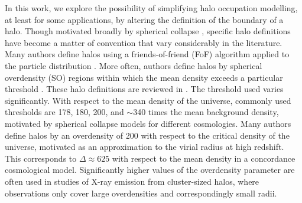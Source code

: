 \documentclass[usenatbib,fleqn]{mnras}
\begin{document}
In this work, we explore the possibility of simplifying halo occupation modelling, at least for some applications, by altering the definition of the boundary of a halo. Though motivated broadly by spherical collapse \citep{gunn_gott72, fillmore_goldreich84, ryden_gunn87, lacey_cole93, eke_etal96, mota_vandebruck04, pace_etal10}, specific halo definitions have become a matter of convention that vary considerably in the literature. Many authors define halos using a friends-of-friend (FoF) algorithm applied to the particle distribution \citep[e.g., ][]{davis_etal85}. More often, authors define halos by spherical overdensity (SO) regions within which the mean density exceeds a particular threshold \citep[e.g., ][]{lacey_cole93}. These halo definitions are reviewed in \citet[][and references therein]{knebe_etal11}. The threshold used varies significantly. With respect to the mean density of the universe, commonly used thresholds are 178, 180, 200, and $\sim$340 times the mean background density, motivated by spherical collapse models for different cosmologies. Many authors define halos by an overdensity of 200 with respect to the critical density of the universe, motivated as an approximation to the virial radius at high redshift. This corresponds to $\Delta \approx 625$ with respect to the mean density in a concordance cosmological model. Significantly higher values of the overdensity parameter are often used in studies of X-ray emission from cluster-sized halos, where observations only cover large overdensities and correspondingly small radii.
\end{document}
